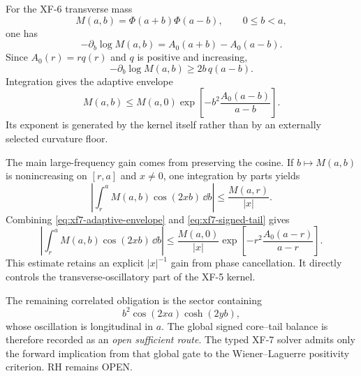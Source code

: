 For the XF-6 transverse mass
\begin{equation}
M(a,b)=\Phi(a+b)\Phi(a-b),
\qquad 0\le b<a,
\end{equation}
one has
\begin{equation}
-\partial_b\log M(a,b)
=A_0(a+b)-A_0(a-b).
\end{equation}
Since $A_0(r)=rq(r)$ and $q$ is positive and increasing,
\begin{equation}
-\partial_b\log M(a,b)
\ge 2b\,q(a-b).
\end{equation}
Integration gives the adaptive envelope
\begin{equation}
\boxed{
M(a,b)
\le M(a,0)
\exp\!\left[-b^2\frac{A_0(a-b)}{a-b}\right].
}
\label{eq:xf7-adaptive-envelope}
\end{equation}
Its exponent is generated by the kernel itself rather than by an externally
selected curvature floor.

The main large-frequency gain comes from preserving the cosine.  If
$b\mapsto M(a,b)$ is nonincreasing on $[r,a]$ and $x\ne0$, one integration by
parts yields
\begin{equation}
\boxed{
\left|
\int_r^a M(a,b)\cos(2xb)\,\dd b
\right|
\le \frac{M(a,r)}{|x|}.
}
\label{eq:xf7-signed-tail}
\end{equation}
Combining \eqref{eq:xf7-adaptive-envelope} and
\eqref{eq:xf7-signed-tail} gives
\begin{equation}
\left|
\int_r^a M(a,b)\cos(2xb)\,\dd b
\right|
\le
\frac{M(a,0)}{|x|}
\exp\!\left[-r^2\frac{A_0(a-r)}{a-r}\right].
\label{eq:xf7-adaptive-signed-tail}
\end{equation}
This estimate retains an explicit $|x|^{-1}$ gain from phase cancellation.
It directly controls the transverse-oscillatory part of the XF-5 kernel.

The remaining correlated obligation is the sector containing
\begin{equation}
b^2\cos(2xa)\cosh(2yb),
\end{equation}
whose oscillation is longitudinal in $a$.  The global signed core--tail
balance is therefore recorded as an \emph{open sufficient route}.  The typed
XF-7 solver admits only the forward implication from that global gate to the
Wiener--Laguerre positivity criterion.  RH remains OPEN.
